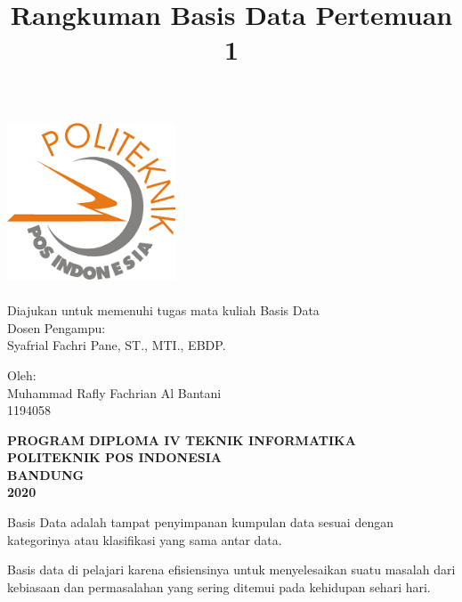 \documentclass[12pt]{article}
\title{Rangkuman Basis Data Pertemuan 1}
\date{}
\begin{document}
\begin{titlepage}
\maketitle
\thispagestyle{empty}

\vspace{0.5cm}
\begin{center}
\includegraphics[width=5cm, height=5cm]{poltekpos.png}
\end{center}
\vspace{0.5cm}
\begin{center}
Diajukan untuk memenuhi tugas mata kuliah Basis Data\\
\vspace{12px}
Dosen Pengampu:\\
Syafrial Fachri Pane, ST., MTI., EBDP.
\vspace{12px}

Oleh:\\
Muhammad Rafly Fachrian Al Bantani\\
1194058
\vspace{14px}

\textbf{PROGRAM DIPLOMA IV TEKNIK INFORMATIKA}\\
\textbf{POLITEKNIK POS INDONESIA\\}\textbf{BANDUNG}\\
\textbf{2020}
\end{center}
\end{titlepage}


\newpage
\maketitle

Basis Data adalah tampat penyimpanan kumpulan data sesuai dengan kategorinya atau klasifikasi yang sama antar data.

Basis data di pelajari karena efisiensinya untuk menyelesaikan suatu masalah dari kebiasaan dan permasalahan yang sering ditemui pada kehidupan sehari hari. 
\end{document}
